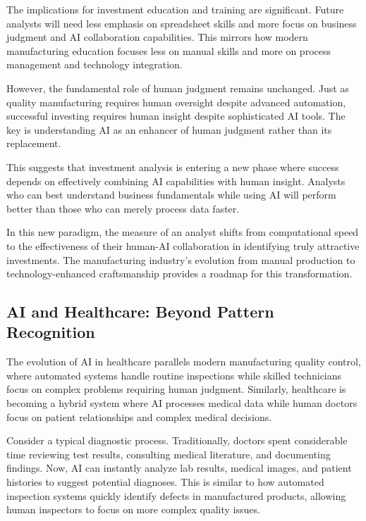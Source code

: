 \documentclass[
  Letterpaper,
]{scrbook}
\begin{document}
The implications for investment education and training are significant.
Future analysts will need less emphasis on spreadsheet skills and more
focus on business judgment and AI collaboration capabilities. This
mirrors how modern manufacturing education focuses less on manual skills
and more on process management and technology integration.

However, the fundamental role of human judgment remains unchanged. Just
as quality manufacturing requires human oversight despite advanced
automation, successful investing requires human insight despite
sophisticated AI tools. The key is understanding AI as an enhancer of
human judgment rather than its replacement.

This suggests that investment analysis is entering a new phase where
success depends on effectively combining AI capabilities with human
insight. Analysts who can best understand business fundamentals while
using AI will perform better than those who can merely process data
faster.

In this new paradigm, the measure of an analyst shifts from
computational speed to the effectiveness of their human-AI collaboration
in identifying truly attractive investments. The manufacturing
industry's evolution from manual production to technology-enhanced
craftsmanship provides a roadmap for this transformation.

\subsection{AI and Healthcare: Beyond Pattern
Recognition}\label{ai-and-healthcare-beyond-pattern-recognition}

The evolution of AI in healthcare parallels modern manufacturing quality
control, where automated systems handle routine inspections while
skilled technicians focus on complex problems requiring human judgment.
Similarly, healthcare is becoming a hybrid system where AI processes
medical data while human doctors focus on patient relationships and
complex medical decisions.

Consider a typical diagnostic process. Traditionally, doctors spent
considerable time reviewing test results, consulting medical literature,
and documenting findings. Now, AI can instantly analyze lab results,
medical images, and patient histories to suggest potential diagnoses.
This is similar to how automated inspection systems quickly identify
defects in manufactured products, allowing human inspectors to focus on
more complex quality issues.
\end{document}
